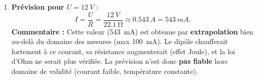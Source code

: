 \documentclass[11pt]{article}
\begin{document}
\begin{corrige}
\begin{enumerate}
      La résistance $R$ est la pente de la droite $U=f(I)$.
      On choisit deux points éloignés sur la droite de tendance (ex. origine et point à $I=100\,\mathrm{mA}$) :
      \[
      R = \frac{\Delta U}{\Delta I} = \frac{\SI{2,21}{V} - \SI{0}{V}}{\SI{100}{mA} - \SI{0}{mA}} = \frac{\SI{2,21}{V}}{\SI{0,100}{A}} = \SI{22,1}{\ohm}.
      \]
      (En prenant le point $I=60\,\mathrm{mA}$ : $R = 1,32 / 0,060 = \SI{22,0}{\ohm}$).
      \textbf{Valeur retenue :} $R \approx \SI{22,1}{\ohm}$.
\item \textbf{Prévision pour $U = \SI{12}{V}$} :
      \[
      I = \frac{U}{R} = \frac{\SI{12}{V}}{\SI{22,1}{\ohm}} \approx \SI{0,543}{A} = \SI{543}{mA}.
      \]
      \textbf{Commentaire :} Cette valeur (\SI{543}{mA}) est obtenue par \textbf{extrapolation} bien au-delà du domaine des mesures (max \SI{100}{mA}). Le dipôle chaufferait fortement à ce courant, sa résistance augmenterait (effet Joule), et la loi d'Ohm ne serait plus vérifiée. La prévision n'est donc \textbf{pas fiable} hors domaine de validité (courant faible, température constante).
\end{enumerate}
\end{corrige}
\end{document}
